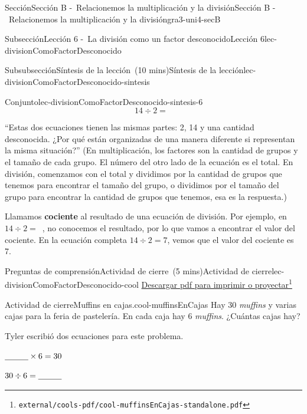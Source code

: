 \documentclass[oneside,10pt,]{article}
\newcommand{\terminology}[1]{\textbf{#1}}
\begin{document}
\begin{sectionptx}{Sección}{Sección B -~Relacionemos la multiplicación y la división}{}{Sección B -~Relacionemos la multiplicación y la división}{}{}{gra3-uni4-secB}
\begin{subsectionptx}{Subsección}{Lección 6 -~La división como un factor desconocido}{}{Lección 6}{}{}{lec-divisionComoFactorDesconocido}
\begin{subsubsectionptx}{Subsubsección}{Síntesis de la lección~(10 mins)}{}{Síntesis de la lección}{}{}{lec-divisionComoFactorDesconocido-sintesis}
\begin{assemblage}{Conjunto}{}{lec-divisionComoFactorDesconocido-sintesis-6}
\begin{equation*}
14 \div 2 = \boxed{\phantom{3}}
\end{equation*}
%
\end{assemblage}
``Estas dos ecuaciones tienen las mismas partes: 2, 14 y una cantidad desconocida. ¿Por qué están organizadas de una manera diferente si representan la misma situación?'' (En multiplicación, los factores son la cantidad de grupos y el tamaño de cada grupo. El número del otro lado de la ecuación es el total. En división, comenzamos con el total y dividimos por la cantidad de grupos que tenemos para encontrar el tamaño del grupo, o dividimos por el tamaño del grupo para encontrar la cantidad de grupos que tenemos, esa es la respuesta.)%
\par
Llamamos \terminology{cociente} al resultado de una ecuación de división. Por ejemplo, en \(14 \div 2 = \boxed{\phantom{3}}\), no conocemos el resultado, por lo que vamos a encontrar el valor del cociente. En la ecuación completa \(14 \div 2 = 7\), vemos que el valor del cociente es 7.%
\end{subsubsectionptx}
%
%
\typeout{************************************************}
\typeout{************************************************}
%
\begin{reading-questions-subsubsection}{Preguntas de comprensión}{Actividad de cierre~(5 mins)}{}{Actividad de cierre}{}{}{lec-divisionComoFactorDesconocido-cool}
\href{external/cools-pdf/cool-muffinsEnCajas-standalone.pdf}{Descargar pdf para imprimir o proyectar}\footnote{\nolinkurl{external/cools-pdf/cool-muffinsEnCajas-standalone.pdf}\label{lec-divisionComoFactorDesconocido-cool-5}}\begin{project}{Actividad de cierre}{Muffins en cajas.}{cool-muffinsEnCajas}%
Hay 30 \emph{muffins} y varias cajas para la feria de pastelería. En cada caja hay 6 \emph{muffins}. ¿Cuántas cajas hay?%
\begin{sidebyside}{2}{0.05}{0.05}{0.1}%
\begin{sbspanel}{0.4}%
Tyler escribió dos ecuaciones para este problema.%
\end{sbspanel}%
\begin{sbspanel}{0.4}%
\(\underline{\hspace{1 cm}} \times 6 = 30\)%
\par
\(30 \div 6 = \underline{\hspace{1 cm}}\)%
\end{sbspanel}%
\end{sidebyside}%
\par

\end{project}
\end{reading-questions-subsubsection}
\end{subsectionptx}
\end{sectionptx}
\end{document}
